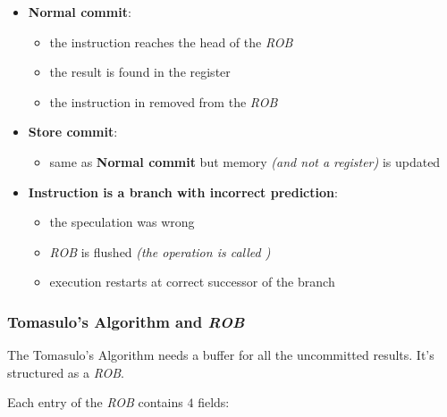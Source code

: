\documentclass[english]{article}
\begin{document}
\begin{itemize}
  \item \textbf{Normal commit}:
        \begin{itemize}
          \item the instruction reaches the head of the \textit{ROB}
          \item the result is found in the register
          \item the instruction in removed from the \textit{ROB}
        \end{itemize}
  \item \textbf{Store commit}:
        \begin{itemize}
          \item same as \textbf{Normal commit} but memory \textit{(and not a register)} is updated
        \end{itemize}
  \item \textbf{Instruction is a branch with incorrect prediction}:
        \begin{itemize}
          \item the speculation was wrong
          \item \textit{ROB} is flushed \textit{(the operation is called )}
          \item execution restarts at correct successor of the branch
        \end{itemize}
\end{itemize}

\subsubsection{Tomasulo's Algorithm and \textit{ROB}}

The Tomasulo's Algorithm needs a buffer for all the uncommitted results.
It's structured as a \textit{ROB}.

Each entry of the \textit{ROB} contains \(4\) fields:
\end{document}
